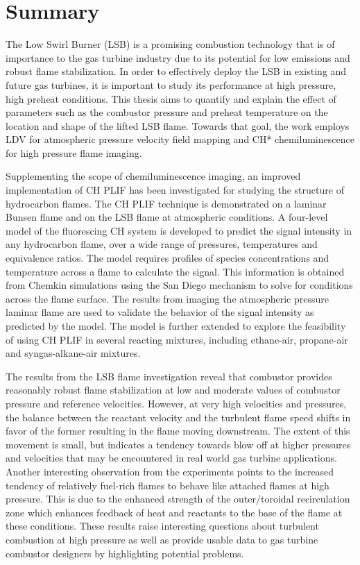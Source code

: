 \chapter*{Summary}

The Low Swirl Burner (LSB) is a promising combustion technology that is of importance to the gas turbine industry due to its potential for low  emissions and robust flame stabilization.
In order to effectively deploy the LSB in existing and future gas turbines, it is important to study its performance at high pressure, high preheat conditions.
This thesis aims to quantify and explain the effect of parameters such as the combustor pressure and preheat temperature on the location and shape of the lifted LSB flame.
Towards that goal, the work employs LDV for atmospheric pressure velocity field mapping and CH* chemiluminescence for high pressure flame imaging.

Supplementing the scope of chemiluminescence imaging, an improved implementation of CH PLIF has been investigated for studying the structure of hydrocarbon flames.
The CH PLIF technique is demonstrated on a laminar Bunsen flame and on the LSB flame at atmospheric conditions.
A four-level model of the fluorescing CH system is developed to predict the signal intensity in any hydrocarbon flame, over a wide range of pressures, temperatures and equivalence ratios.
The model requires profiles of species concentrations and temperature across a flame to calculate the signal.
This information is obtained from Chemkin simulations using the San Diego mechanism to solve for conditions across the flame surface.
The results from imaging the atmospheric pressure laminar flame are used to validate the behavior of the signal intensity as predicted by the model.
The model is further extended to explore the feasibility of using CH PLIF in several reacting mixtures, including ethane-air, propane-air and syngas-alkane-air mixtures.

The results from the LSB flame investigation reveal that combustor provides reasonably robust flame stabilization at low and moderate values of combustor pressure and reference velocities.
However, at very high velocities and pressures, the balance between the reactant velocity and the turbulent flame speed shifts in favor of the former resulting in the flame moving downstream.
The extent of this movement is small, but indicates a tendency towards blow off at higher pressures and velocities that may be encountered in real world gas turbine applications.
Another interesting observation from the experiments points to the increased tendency of relatively fuel-rich flames to behave like attached flames at high pressure.
This is due to the enhanced strength of the outer/toroidal recirculation zone which enhances feedback of heat and reactants to the base of the flame at these conditions.
These results raise interesting questions about turbulent combustion at high pressure as well as provide usable data to gas turbine combustor designers by highlighting potential problems.

